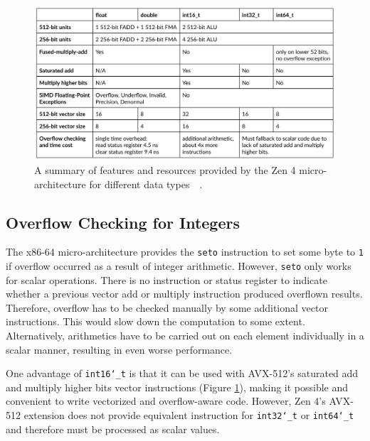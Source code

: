 \documentclass[logo,bsc,singlespacing,parskip]{infthesis}
\newcommand{\dtshort}{\texttt{int16\char`_t}}
\newcommand{\dtint}{\texttt{int32\char`_t}}
\newcommand{\dtlong}{\texttt{int64\char`_t}}
\begin{document}
\begin{figure}[H]\captionsetup{name=Figure}
    \includegraphics[width=\linewidth]{image/arch-table.png}
    \caption{A summary of features and resources provided by the Zen 4
    micro-architecture for different data
    types~\cite{Zen4Critique}~\cite{Zen2ChipWiki}.}
    \label{archtable}
\end{figure}

\subsection{Overflow Checking for Integers}
\label{sec:overflow-int}

The x86-64 micro-architecture provides the \texttt{seto} instruction to set some byte to \texttt{1} if overflow occurred as a result of integer arithmetic. However, \texttt{seto} only works for scalar operations. There is no instruction or status register to indicate whether a previous vector add or multiply instruction produced overflown results. Therefore, overflow has to be checked manually by some additional vector instructions. This would slow down the computation to some extent. Alternatively, arithmetics have to be carried out on each element individually in a scalar manner, resulting in even worse performance. 

One advantage of \dtshort{} is that it can be used with AVX-512's saturated add and multiply higher bits vector instructions (Figure \ref{archtable}), making it possible and convenient to write vectorized and overflow-aware code. However, Zen 4's AVX-512 extension does not provide equivalent instruction for \dtint{} or \dtlong{} and therefore must be processed as scalar values.
\end{document}
